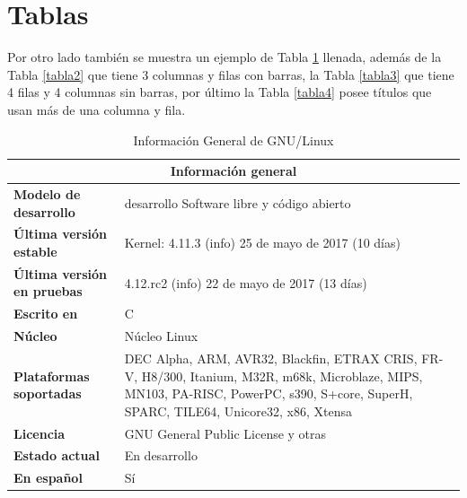 \begin{definir}\label{definir1}
\lipsum[1] %
\end{definir}

\begin{prueba}\label{prueba1}
\lipsum[1] %
\end{prueba}

\begin{demostracion} \label{demo1}
\lipsum[1] %
\end{demostracion}

\begin{obs}\label{obs1}
\lipsum[1] %
\end{obs}

\section{Tablas}
Por otro lado también se muestra un ejemplo de Tabla \ref{tabla1} llenada, además de la Tabla \ref{tabla2} que tiene 3 columnas y filas con barras, la Tabla \ref{tabla3} que tiene 4 filas y 4 columnas sin barras, por último la Tabla \ref{tabla4} posee títulos que usan más de una columna y fila.

\begin{table}[hbt]
\begin{center}
\begin{tabular}{|l|p{10cm}|}\hline
\multicolumn{2}{|c|}{\textbf{Información general}}\\
\hline
\textbf{Modelo de desarrollo}&desarrollo	Software libre y código abierto\\
\textbf{Última versión estable}&Kernel: 4.11.3 (info) 25 de mayo de 2017 (10 días)\\
\textbf{Última versión en pruebas}&	4.12.rc2 (info) 22 de mayo de 2017 (13 días)\\
\textbf{Escrito en}&	C\\
\textbf{Núcleo}&	Núcleo Linux\\
\textbf{Plataformas soportadas}	& DEC Alpha, ARM, AVR32, Blackfin, ETRAX CRIS, FR-V, H8/300, Itanium, M32R, m68k, Microblaze, MIPS, MN103, PA-RISC, PowerPC, s390, S+core, SuperH, SPARC, TILE64, Unicore32, x86, Xtensa\\
\textbf{Licencia}	&GNU General Public License y otras\\
\textbf{Estado actual}	&En desarrollo\\
\textbf{En español}	&Sí\\
\hline
\end{tabular}
\end{center}
\caption{Información General de GNU/Linux}
\label{tabla1}
\end{table}


